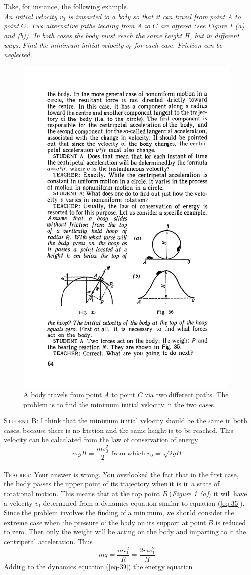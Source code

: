 \documentclass[a4paper,sfsidenotes]{tufte-book}
\begin{document}
Take, for instance, the following example. \\
\emph{An initial velocity $v_{0}$ is imparted to a body so that it can travel from point $A$ to point $C$. Two alternative paths leading from $A$ to $C$ are offered (see \emph{Figure \ref{fig-36} (a)} and \emph{(b)}). In both cases the body must reach the same height $H$, but in different ways. Find the minimum initial velocity $v_{0}$ for each case. Friction can be neglected.}
\\
\begin{figure}
\centering
\includegraphics[width=0.6\linewidth]{fig-036a.pdf}
\caption{A body travels from point $A$ to point $C$ via two different paths. The problem is to find the minimum initial velocity in the two cases.}
\label{fig-36}
\end{figure}

\textsc{Student B:} I think that the minimum initial velocity should be the same in both cases, because there is no friction and the same height is to be reached. This velocity can be calculated from the law of conservation of energy
\begin{equation*}
mgH = \frac{mv_{0}^{2}}{2} \, \, \text{from which} \, \, v_{0} = \sqrt{2gH}
\end{equation*}
\\
\textsc{Teacher:} Your answer is wrong. You overlooked the fact that in the first case, the body passes the upper point of its trajectory when it is in a state of rotational motion. This means that at the top point $B$ (\emph{Figure \ref{fig-36} (a)}) it will have a velocity $v_{1}$ determined from a dynamics equation similar to equation (\ref{eq-35}). Since the problem involves the finding of a minimum, we should consider the extreme case when the pressure of the body on its support at point $B$ is reduced to zero. Then only the weight will be acting on the body and imparting to it the centripetal acceleration. Thus
\begin{equation}
mg=\frac{mv_{1}^{2}}{R} = \frac{2mv_{1}^{2}}{H}
\label{eq-39}
\end{equation}
Adding to the dynamics equation (\ref{eq-39}) the energy equation
\end{document}
